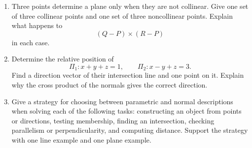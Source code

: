 \begin{enumerate}
\item Three points determine a plane only when they are not collinear. Give one
set of three collinear points and one set of three noncollinear points. Explain
what happens to
\[
(Q-P)\times(R-P)
\]
in each case.

\item Determine the relative position of
\[
\Pi_1:x+y+z=1,
\qquad
\Pi_2:x-y+z=3.
\]
Find a direction vector of their intersection line and one point on it. Explain
why the cross product of the normals gives the correct direction.

\item Give a strategy for choosing between parametric and normal descriptions
when solving each of the following tasks: constructing an object from points or
directions, testing membership, finding an intersection, checking
parallelism or perpendicularity, and computing distance. Support the strategy
with one line example and one plane example.

\end{enumerate}
